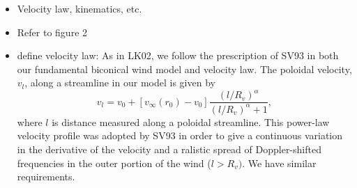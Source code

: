 \documentclass[preprint, a4paper, 11pt]{aastex}
\begin{document}
\begin{itemize}
\item Velocity law, kinematics, etc. 
\item Refer to figure 2
\item define velocity law: As in LK02, we follow the prescription of SV93 in both our fundamental biconical wind model and velocity law. 
The poloidal velocity, $v_l$, along a streamline in our model is given
by 
\begin{equation}
v_l=v_0+\left[v_{\infty}(r_0)-v_0\right]\frac{\left(l/R_v\right)^{\alpha}}{\left(l/R_v\right)^{\alpha}+1},
\label{v_law}
\end{equation}
where $l$ is distance measured along a poloidal streamline. This
power-law velocity profile was adopted by SV93 in order to give a 
continuous variation in the derivative of the velocity and a 
ralistic spread of Doppler-shifted frequencies in the outer portion
of the wind (${l > R_v})$. We have similar requirements.
\end{itemize}


\end{document}
